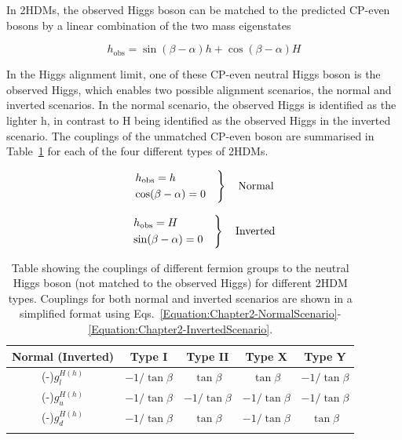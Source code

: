 In 2HDMs, the observed Higgs boson can be matched to the predicted CP-even bosons by a linear combination of the two mass eigenstates 

\begin{equation}
    h_{\text{obs}} = \sin{(\beta - \alpha)} h + \cos{(\beta - \alpha)} H 
\end{equation}

In the Higgs alignment limit, one of these CP-even neutral Higgs boson is the observed Higgs, which enables two possible alignment scenarios, the normal and inverted scenarios. In the normal scenario, the observed Higgs is identified as the lighter h, in contrast to H being identified as the observed Higgs in the inverted scenario. The couplings of the unmatched CP-even boson are summarised in Table~\ref{Table:Chapter2_2HDM-CouplingsAlignmentLimit} for each of the four different types of 2HDMs.

\begin{equation}
\begin{rcases}
  h_{\text{obs}} = h \\
  \cos(\beta-\alpha) = 0 
\quad \end{rcases}
\quad \text{Normal}
\label{Equation:Chapter2-NormalScenario}
\end{equation}

\begin{equation}
\begin{rcases}
  h_{\text{obs}} = H \\
  \sin(\beta-\alpha) = 0
\quad \end{rcases}
\quad \text{Inverted}
\label{Equation:Chapter2-InvertedScenario}
\end{equation}


\begin{table}[h]
\centering
\renewcommand{\arraystretch}{1.5} %
\setlength{\tabcolsep}{12pt} %
\begin{tabular}{|c|c|c|c|c|}
\hline
Normal (Inverted)     & Type I                     & Type II                     & Type X                                        & Type Y                      \\ \hline \hline
(-)$g_l^{H(h)}$ & $-1/\tan{\beta}$  & $\tan{\beta}$  & $\tan{\beta}$                    & $-1/\tan{\beta}$  \\ \arrayrulecolor{lightgray} \hline
(-)$g_u^{H(h)}$ & $-1/\tan{\beta}$  & $-1/\tan{\beta}$  & $-1/\tan{\beta}$                    & $-1/\tan{\beta}$  \\ \arrayrulecolor{lightgray} \hline
(-)$g_d^{H(h)}$ & $-1/\tan{\beta}$  & $\tan{\beta}$  & $-1/\tan{\beta}$                    & $\tan{\beta}$  \\ \arrayrulecolor{black} \hline
\end{tabular}
\caption{Table showing the couplings of different fermion groups to the neutral Higgs boson (not matched to the observed Higgs) for different 2HDM types. Couplings for both normal and inverted scenarios are shown in a simplified format using Eqs.~\ref{Equation:Chapter2-NormalScenario}-\ref{Equation:Chapter2-InvertedScenario}.}
\label{Table:Chapter2_2HDM-CouplingsAlignmentLimit}
\end{table}

